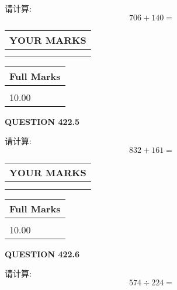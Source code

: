 \documentclass{ctexart}
\begin{document}
  
 
请计算:
\begin{equation}
706 +  %
140 = \nonumber
\end{equation}
 

 

 
  
\vspace{0.2in}
  
\noindent\begin{tabular}{|l|}
\hline
 YOUR MARKS  \\
\hline
 \\ 
 \\ 
\hline
\end{tabular}
\hspace{0.05in} \begin{tabular}{|l|}
\hline
 Full Marks  \\
\hline
 \\ 
10.00 \\
\hline
\end{tabular}
{\textbf{\Large{QUESTION
422.5 
}}}
  
  
 
请计算:
\begin{equation}
832 +  %
161 = \nonumber
\end{equation}
 

 

 
  
\vspace{0.2in}
  
\noindent\begin{tabular}{|l|}
\hline
 YOUR MARKS  \\
\hline
 \\ 
 \\ 
\hline
\end{tabular}
\hspace{0.05in} \begin{tabular}{|l|}
\hline
 Full Marks  \\
\hline
 \\ 
10.00 \\
\hline
\end{tabular}
{\textbf{\Large{QUESTION
422.6 
}}}
  
  
 
请计算:
\begin{equation}
574  \div    %
224 = \nonumber
\end{equation}
 

 

 
  
\vspace{0.2in}
  
\end{document}
